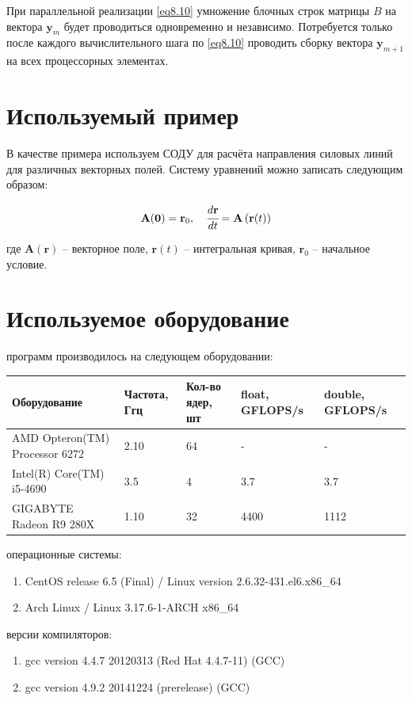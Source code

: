 \documentclass[14pt,final,titlepage,pscyr]{hedwork}
\renewcommand{\vec}[1]{\mathbf{#1}}
\begin{document}
	При параллельной реализации \eqref{eq8.10} умножение блочных строк матрицы \( B \) на вектора 
	\( \vec{y}_m \) будет проводиться одновременно и независимо. Потребуется только после каждого 
	вычислительного шага по \eqref{eq8.10} проводить сборку вектора \( \vec{y}_{m+1} \) на всех процессорных 
	элементах.\cite{methods}

\section{Используемый пример}
В качестве примера используем СОДУ для расчёта направления силовых линий для различных векторных 
полей. Систему уравнений можно записать следующим образом:

\[
	\vec{A}(\vec{0}) = \vec{r}_0, \quad \cfrac{d\vec{r}}{dt} = \vec{A}\left( \vec{r}(t) \right)
\]

где \( \vec{A}(\vec{r}) \) -- векторное поле, \( \vec{r}(t) \) -- интегральная кривая, 
\( \vec{r}_0 \) -- начальное условие.

\newpage

\section{Используемое оборудование}
 программ производилось на следующем оборудовании:
\begin{table}[h]
    \center
    \begin{tabular}{|C{5cm}|C{2cm}|C{2cm}|C{3cm}|C{3cm}|}
        \hline
        Оборудование & Частота, Ггц & Кол-во ядер, шт & float, GFLOPS/s & double, GFLOPS/s \\ \hline
        AMD Opteron(TM) Processor 6272 & 2.10 & 64 & - & - \\ \hline
        Intel(R) Core(TM) i5-4690 & 3.5 & 4 & 3.7 & 3.7 \\ \hline
        GIGABYTE Radeon R9 280X & 1.10 & 32 & 4400 & 1112 \\ \hline
    \end{tabular}
\end{table}

 операционные системы:
\begin{enumerate}
	\item CentOS release 6.5 (Final) / Linux version 2.6.32-431.el6.x86\_64
	\item Arch Linux / Linux 3.17.6-1-ARCH x86\_64
\end{enumerate}

 версии компиляторов:
\begin{enumerate}
	\item gcc version 4.4.7 20120313 (Red Hat 4.4.7-11) (GCC)
	\item gcc version 4.9.2 20141224 (prerelease) (GCC) 
\end{enumerate}
\end{document}
